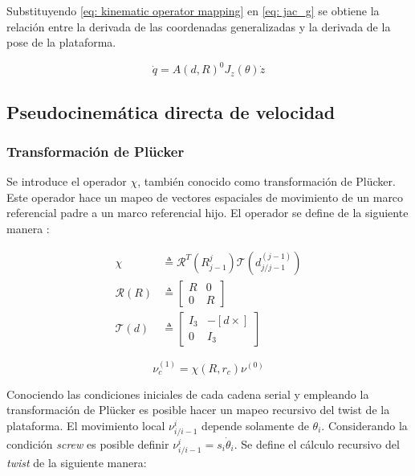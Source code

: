 Substituyendo \eqref{eq: kinematic operator mapping}
en \eqref{eq: jac_g} se obtiene la relación entre
la derivada de las coordenadas generalizadas y 
la derivada de la pose de la plataforma.

\begin{equation} \label{eq: q_twist}
\dot{q} = A(d,R)^0J_z(\theta) \dot{z}
\end{equation}

\subsection{Pseudocinemática directa de velocidad}

\subsubsection{Transformación de Plücker}

Se introduce el operador $\chi$, 
también conocido como transformación de Plücker.
Este operador hace un mapeo de vectores 
espaciales de movimiento de un marco referencial padre a un 
marco referencial hijo.
El operador se define de la siguiente manera \cite{olguin20183d}:

\begin{subequations}
 \begin{align}
  \chi & \triangleq \mathcal R^T(R_{j-1}^j) \mathcal T(d_{j/j-1}^{(j-1)})\label{eq: chi operator}\\
  \mathcal R(R) & \triangleq \begin{bmatrix}
                              R & 0\\
                              0 & R
                             \end{bmatrix}\\
  \mathcal T(  d) & \triangleq   \begin{bmatrix}
                                        I_3 & -[  d \times]\\
                                        0 & I_3
                                       \end{bmatrix}
 \end{align}
\end{subequations}

\begin{equation}\label{eq: plucker mapping}
 \nu_c^{(1)} = \chi(R, r_c) \nu^{(0)}
\end{equation}


Conociendo las condiciones iniciales de cada cadena serial
y empleando la transformación de Plücker
es posible hacer un mapeo recursivo del twist
de la plataforma.
El movimiento local 
$\nu_{i/i-1}^{i}$ depende solamente de 
$  \theta_i$.
Considerando la condición \emph{screw}
es posible definir 
$\nu_{i/i-1}^{i} = s_i \dot{\theta}_i$.
Se define el cálculo recursivo del \emph{twist} 
de la siguiente manera:

